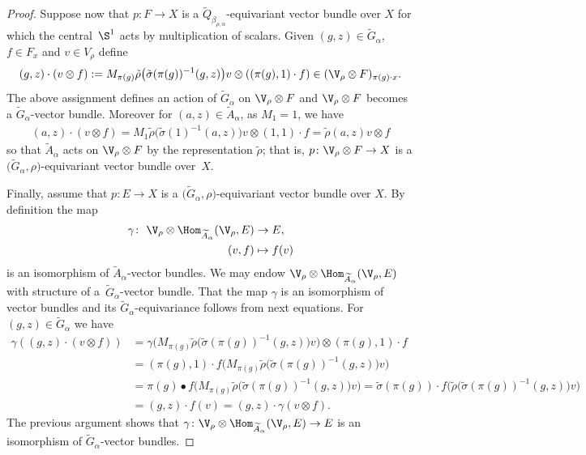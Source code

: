 \begin{proof}
Suppose now that $p \colon F \rightarrow X$ is a
$\widetilde{Q}_{\beta_{\rho,\alpha}}$-equivariant vector bundle over $X$
for which the central~$\S^{1}$ acts by multiplication of
scalars. Given $(g,z)\in \widetilde{G}_{\alpha}$, $f\in F_{x}$ and $v\in
V_{\rho}$ define
\begin{gather}
(g,z)\cdot (v\otimes f):=M_{\pi(g)}\tilde{\rho}\big(\tilde{\sigma}(\pi(g))^{-1}(g,z)\big)v\otimes
((\pi(g),1)\cdot f)\in (\V_{\rho}\otimes F)_{\pi(g)\cdot x}.
\label{ecu:ac2}
\end{gather}
The above assignment defines an action of $\widetilde{G}_{\alpha}$
on $\V_{\rho}\otimes F$ and $\V_{\rho}\otimes F$
becomes a $\widetilde{G}_{\alpha}$-vector bundle.
Moreover for $(a,z)\in \widetilde{A}_{\alpha}$, as $M_{1}=1$, we have
\begin{gather*}
(a,z)\cdot (v\otimes
f)=M_{1}\tilde{\rho}\big(\tilde{\sigma}(1)^{-1}(a,z)\big)v\otimes
(1,1)\cdot f=\tilde{\rho}(a,z)v\otimes f
\end{gather*}
so that $\widetilde{A}_{\alpha}$ acts on $\V_{\rho}\otimes
F$ by the representation $\tilde{\rho}$; that is,
$p\colon \V_{\rho}\otimes F\rightarrow X$ is a
$\big(\widetilde{G}_{\alpha},\rho\big)$-equivariant vector bundle
over~$X$.
	
Finally, assume that $p\colon E \rightarrow X$ is a
$\big(\widetilde{G}_{\alpha},\rho\big)$-equivariant vector bundle over $X$.
By definition the map
\begin{align*}
\gamma\colon \ \V_{\rho}\otimes
\Hom_{\widetilde{A}_{\alpha}}(\V_{\rho},E)&\rightarrow E,
\\
(v,f)&\mapsto f(v)
\end{align*}
is an isomorphism of $\widetilde{A}_{\alpha}$-vector bundles. We may endow
$\V_{\rho}\otimes\Hom_{\widetilde{A}_{\alpha}}(\V_{\rho},E)$
with structure of a~$\widetilde{G}_{\alpha}$-vector bundle. That the map
$\gamma$ is an isomorphism of vector bundles and its
$\widetilde{G}_{\alpha}$-equivariance follows from next equations.
For $(g,z)\in \widetilde{G}_{\alpha}$ we have
\begin{align*}
\gamma((g,z)\cdot(v\otimes
f))&=\gamma\big(M_{\pi(g)}\tilde{\rho}\big(\tilde{\sigma}(\pi(g))^{-1}(g,z)\big)v\big)\otimes
(\pi(g),1)\cdot f\\
&=(\pi(g),1)\cdot f
\big(M_{\pi(g)}\tilde{\rho}\big(\tilde{\sigma}(\pi(g))^{-1}(g,z)\big)v\big)\\
&=\pi(g)\bullet\!
f\big(M_{\pi(g)}\tilde{\rho}\big(\tilde{\sigma}(\pi(g))^{-1}(g,z)\big)v\big)
\!=\tilde{\sigma}(\pi(g))\!\cdot
f\big(\tilde{\rho}\big(\tilde{\sigma}(\pi(g))^{-1}(g,z)\big)v\big)\\
	&=(g,z)\cdot f(v)=(g,z)\cdot\gamma(v\otimes f).
\end{align*}
The previous argument shows that $\gamma\colon
\V_{\rho}\otimes
\Hom_{\widetilde{A}_{\alpha}}(\V_{\rho},E)\rightarrow
E$ is an isomorphism of $\widetilde{G}_{\alpha}$-vector bundles.
	

\end{proof}
